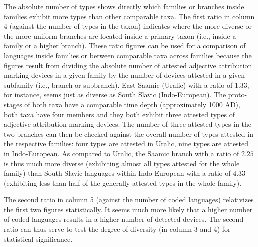 The absolute number of types shows directly which families or branches inside families exhibit more types than other comparable taxa. The first ratio in column 4 (against the number of types in the taxon) indicates where the more diverse or the more uniform branches are located inside a primary taxon (i.e., inside a family or a higher branch). These ratio figures can be used for a comparison of languages inside families or between comparable taxa across families because the figures result from dividing the absolute number of attested adjective attribution marking devices in a given family by the number of devices attested in a given subfamily (i.e., branch or subbranch). East Saamic (Uralic) with a ratio of $1.33$, for instance, seems just as diverse as South Slavic (Indo-European). The proto-stages of both taxa have a comparable time depth (approximately 1000 AD), both taxa have four members and they both exhibit three attested types of adjective attribution marking devices. The number of three attested types in the two branches can then be checked against the overall number of types attested in the respective families: four types are attested in Uralic, nine types are attested in Indo-European. As compared to Uralic, the Saamic branch with a ratio of $2.25$ is thus much more diverse (exhibiting almost all types attested for the whole family) than South Slavic languages within Indo-European with a ratio of $4.33$ (exhibiting less than half of the generally attested types in the whole family).

The second ratio in column 5 (against the number of coded languages) relativizes the first two figures statistically. It seems much more likely that a higher number of coded languages results in a higher number of detected devices. The second ratio can thus serve to test the degree of diversity (in column 3 and 4) for statistical significance. 

